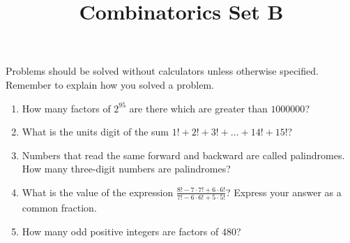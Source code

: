 \documentclass{article}
\title{Combinatorics Set B}
\author{}
\date{}
\begin{document}
    \maketitle
    \noindent Problems should be solved without calculators unless otherwise specified.
    Remember to explain how you solved a problem.
    \begin{enumerate}
        \item How many factors of $2^{95}$ are there which are greater than $1000000$?
        \vspace{3cm}
        \item What is the units digit of the sum $1! + 2! + 3! + \dots + 14! + 15!$?
        \vspace{3cm}
        \item Numbers that read the same forward and backward are called palindromes. How many
        three-digit numbers are palindromes?
        \pagebreak
        \item What is the value of the expression $\frac{8! - 7 \cdot 7! + 6 \cdot 6!}
        {7! - 6 \cdot 6! + 5 \cdot 5!}$? Express your answer as a common fraction.
        \vspace{3cm}
        \item How many odd positive integers are factors of $480$?
        \vspace{3cm}
    \end{enumerate}
\end{document}

